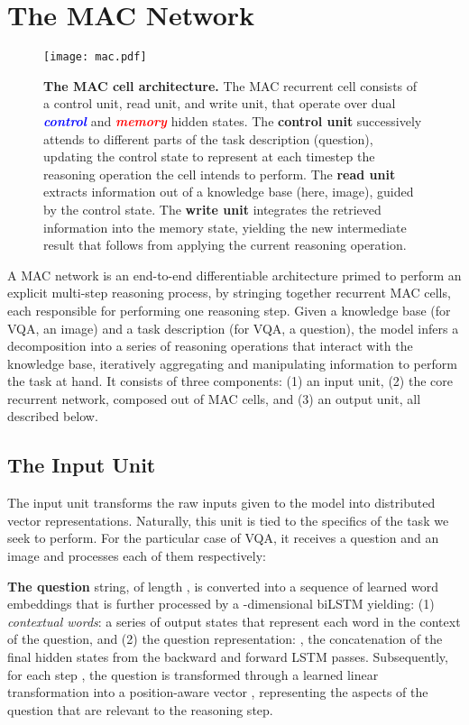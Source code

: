 \documentclass[fleqn]{article}
\begin{document}
\section{The MAC Network}
\label{sec:model}

\begin{figure}[t]

\centering
\texttt{[image: mac.pdf]}

\caption{\textbf{The MAC cell architecture.} The MAC recurrent cell consists of a control unit, read unit, and write unit, that operate over dual \textit{\textbf{\textcolor{Blue}{control}}} and \textit{\textbf{\textcolor{Red}{memory}}} hidden states. The \textbf{control unit} successively attends to different parts of the task description (question), updating the control state to represent at each timestep the reasoning operation the cell intends to perform. The \textbf{read unit} extracts information out of a knowledge base (here, image), guided by the control state. The  \textbf{write unit} integrates the retrieved information into the memory state, yielding the new intermediate result that follows from applying the current reasoning operation.}
\label{fig:mac}
\end{figure}

A MAC network is an end-to-end differentiable architecture primed to perform an explicit multi-step reasoning process, by stringing together  recurrent MAC cells, each responsible for performing one reasoning step. Given a knowledge base  (for VQA, an image) and a task description  (for VQA, a question), the model infers a decomposition into a series of  reasoning operations that interact with the knowledge base, iteratively aggregating and manipulating information to perform the task at hand. It consists of three components: (1) an input unit, (2) the core recurrent network, composed out of  MAC cells, and (3) an output unit, all described below.

\subsection{The Input Unit}

The input unit transforms the raw inputs given to the model into distributed vector representations. Naturally, this unit is tied to the specifics of the task we seek to perform. For the particular case of VQA, it receives a  question and an image and processes each of them respectively: 

\textbf{The question} string, of length , is converted into a sequence of learned word embeddings that is further processed by a -dimensional biLSTM yielding: (1) \textit{contextual words}: a series of output states  that represent each word in the context of the question, and (2) the question representation: , the concatenation of the final hidden states from the backward and forward LSTM passes. Subsequently, for each step , the question  is transformed through a learned linear transformation into a position-aware vector , representing the aspects of the question that are relevant to the  reasoning step.
\end{document}
